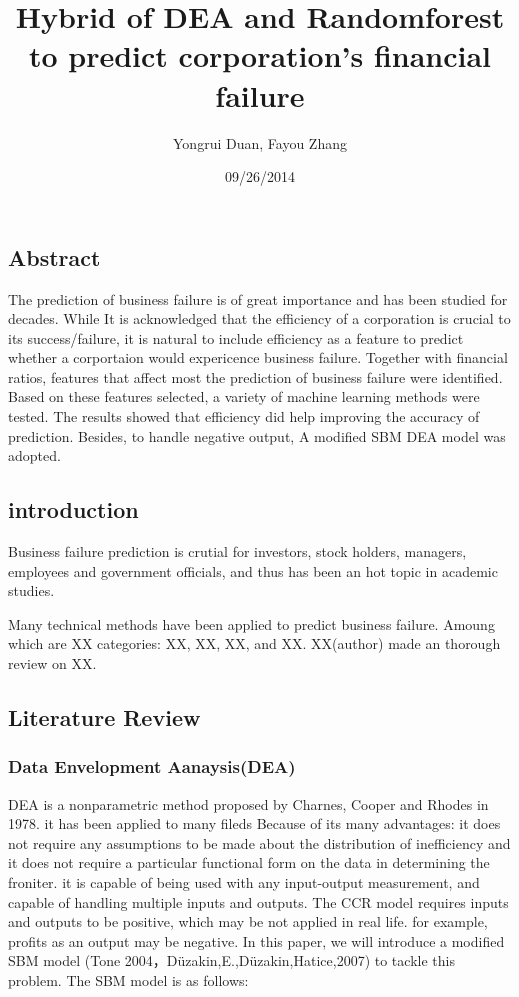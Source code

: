 \documentclass[]{article}
\title{Hybrid of DEA and Randomforest to predict corporation's financial
failure}
\author{Yongrui Duan, Fayou Zhang}
\date{09/26/2014}
\begin{document}
\maketitle


{
\hypersetup{linkcolor=black}
\setcounter{tocdepth}{2}
\tableofcontents
}
\subsection{Abstract}\label{abstract}
The prediction of business failure is of great importance and has been studied
for decades. While It is acknowledged that the efficiency of a corporation is crucial to its success/failure,
it is natural to include efficiency as a feature to predict whether a corportaion would expericence business failure.
Together with financial ratios, features that affect most the prediction of  business failure were identified. Based on these
features selected, a variety of machine learning methods were tested. The results showed that efficiency did help improving the accuracy of 
prediction. Besides, to handle negative output, A modified SBM DEA model was adopted.

\subsection{introduction}\label{introduction}

Business failure prediction is crutial for investors, stock holders,
managers, employees and government officials, and thus has been an hot
topic in academic studies.

Many technical methods have been applied to predict business failure.
Amoung which are XX categories: XX, XX, XX, and XX. XX(author) made an
thorough review on XX.

\subsection{Literature Review}\label{literature-review}

\subsubsection{Data Envelopment
Aanaysis(DEA)}\label{data-envelopment-aanaysisdea}

DEA is a nonparametric method proposed by Charnes, Cooper and Rhodes in
1978. it has been applied to many fileds Because of its many advantages:
it does not require any assumptions to be made about the distribution of
inefficiency and it does not require a particular functional form on the
data in determining the froniter. it is capable of being used with any
input-output measurement, and capable of handling multiple inputs and
outputs. The CCR model requires inputs and outputs to be positive, which
may be not applied in real life. for example, profits as an output may
be negative. In this paper, we will introduce a modified SBM model (Tone
2004，Düzakin,E.,Düzakin,Hatice,2007) to tackle this problem. The SBM
model is as follows:
\end{document}
